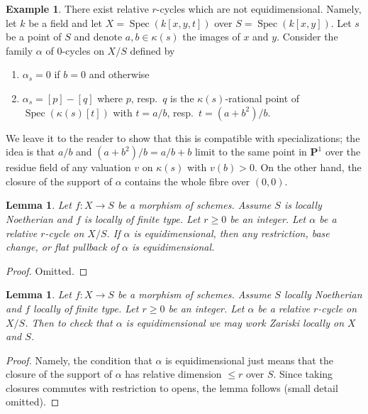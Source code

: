 \documentclass{stacks-project}
\newenvironment{reference}{\comment}{\endcomment}
\theoremstyle{plain}
\newtheorem{lemma}[subsection]{Lemma}
\theoremstyle{definition}
\newtheorem{example}[subsection]{Example}
\theoremstyle{remark}
\numberwithin{equation}{subsection}
\def\Spec{\mathop{\mathrm{Spec}}}
\begin{document}
\begin{example}
\label{example-not-equidimensional}
\begin{reference}
\cite[Example 3.1.9]{SV}
\end{reference}
There exist relative $r$-cycles which are not equidimensional.
Namely, let $k$ be a field and let $X = \Spec(k[x, y, t])$
over $S = \Spec(k[x, y])$. Let $s$ be a point of $S$ and
denote $a, b \in \kappa(s)$ the images of $x$ and $y$.
Consider the family $\alpha$ of $0$-cycles on $X/S$ defined by
\begin{enumerate}
\item $\alpha_s = 0$ if $b = 0$ and otherwise
\item $\alpha_s = [p] - [q]$ where $p$, resp.\ $q$ is the $\kappa(s)$-rational
point of $\Spec(\kappa(s)[t])$ with $t = a/b$,
resp.\ $t = (a + b^2)/b$.
\end{enumerate}
We leave it to the reader to show that this is compatible with specializations;
the idea is that $a/b$ and $(a + b^2)/b = a/b + b$ limit to the same point
in $\mathbf{P}^1$ over the residue field of any valuation $v$ on $\kappa(s)$
with $v(b) > 0$. On the other hand, the closure of the support of $\alpha$
contains the whole fibre over $(0, 0)$.
\end{example}

\begin{lemma}
\label{lemma-equidimensional-functoriality}
Let $f : X \to S$ be a morphism of schemes. Assume $S$ is locally Noetherian
and $f$ is locally of finite type. Let $r \geq 0$ be an integer. Let
$\alpha$ be a relative $r$-cycle on $X/S$. If $\alpha$ is equidimensional,
then any restriction, base change, or flat pullback of $\alpha$ is
equidimensional.
\end{lemma}

\begin{proof}
Omitted.
\end{proof}

\begin{lemma}
\label{lemma-check-equidimensional}
Let $f : X \to S$ be a morphism of schemes. Assume $S$ locally Noetherian
and $f$ locally of finite type. Let $r \geq 0$ be an integer. Let $\alpha$
be a relative $r$-cycle on $X/S$. Then to check that $\alpha$ is equidimensional
we may work Zariski locally on $X$ and $S$.
\end{lemma}

\begin{proof}
Namely, the condition that $\alpha$ is equidimensional just means that
the closure of the support of $\alpha$ has relative dimension $\leq r$
over $S$. Since taking closures commutes with restriction to opens,
the lemma follows (small detail omitted).
\end{proof}
\end{document}
